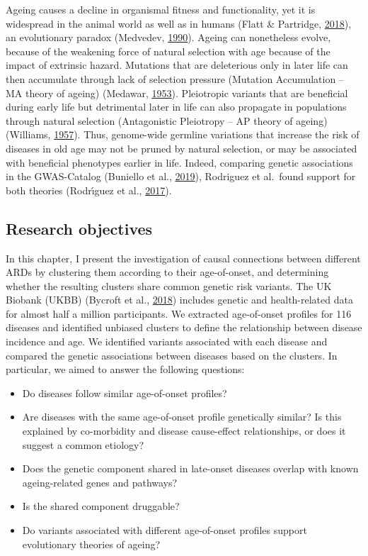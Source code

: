 \documentclass[12pt,twoside]{unicam}
\providecommand{\tightlist}{%
  \setlength{\itemsep}{0pt}\setlength{\parskip}{0pt}}
\begin{document}
Ageing causes a decline in organismal fitness and functionality, yet it is widespread in the animal world as well as in humans (Flatt \& Partridge, \protect\hyperlink{ref-Flatt2018}{2018}), an evolutionary paradox (Medvedev, \protect\hyperlink{ref-Medvedev1990}{1990}). Ageing can nonetheless evolve, because of the weakening force of natural selection with age because of the impact of extrinsic hazard. Mutations that are deleterious only in later life can then accumulate through lack of selection pressure (Mutation Accumulation -- MA theory of ageing) (Medawar, \protect\hyperlink{ref-Medawar1953}{1953}). Pleiotropic variants that are beneficial during early life but detrimental later in life can also propagate in populations through natural selection (Antagonistic Pleiotropy -- AP theory of ageing) (Williams, \protect\hyperlink{ref-Williams1957}{1957}). Thus, genome-wide germline variations that increase the risk of diseases in old age may not be pruned by natural selection, or may be associated with beneficial phenotypes earlier in life. Indeed, comparing genetic associations in the GWAS-Catalog (Buniello et al., \protect\hyperlink{ref-Buniello2019}{2019}), Rodriguez et al.~found support for both theories (Rodrı́guez et al., \protect\hyperlink{ref-Rodriguez2017}{2017}).

\hypertarget{research-objectives-1}{%
\subsection{Research objectives}\label{research-objectives-1}}

In this chapter, I present the investigation of causal connections between different ARDs by clustering them according to their age-of-onset, and determining whether the resulting clusters share common genetic risk variants. The UK Biobank (UKBB) (Bycroft et al., \protect\hyperlink{ref-Bycroft2018}{2018}) includes genetic and health-related data for almost half a million participants. We extracted age-of-onset profiles for 116 diseases and identified unbiased clusters to define the relationship between disease incidence and age. We identified variants associated with each disease and compared the genetic associations between diseases based on the clusters. In particular, we aimed to answer the following questions:

\begin{itemize}
\tightlist
\item
  Do diseases follow similar age-of-onset profiles?
\item
  Are diseases with the same age-of-onset profile genetically similar? Is this explained by co-morbidity and disease cause-effect relationships, or does it suggest a common etiology?
\item
  Does the genetic component shared in late-onset diseases overlap with known ageing-related genes and pathways?
\item
  Is the shared component druggable?
\item
  Do variants associated with different age-of-onset profiles support evolutionary theories of ageing?
\end{itemize}
\end{document}
